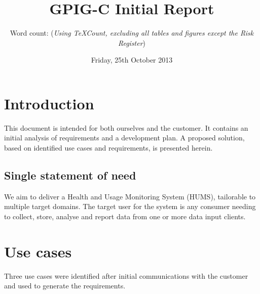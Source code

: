 \documentclass[10pt,a4paper]{article}
\begin{document}
\title{\vspace{-1cm}GPIG-C Initial Report}
\author{Word count:  (\textit{Using TeXCount, excluding all tables and figures except the Risk Register})}
\date{Friday, 25th October 2013}
\maketitle
\thispagestyle{fancy} %


\section{Introduction} %
This document is intended for both ourselves and the customer. It contains
an initial analysis of requirements and a development plan. A proposed solution,
based on identified use cases and requirements, is presented herein.
 
\subsection{Single statement of need} %
We aim to deliver a Health and Usage Monitoring System (HUMS), tailorable to
multiple target domains. The target user for the system is any consumer needing
to collect, store, analyse and report data from one or more data input clients.


\section{Use cases}
Three use cases were identified after initial communications with the customer and used to generate the requirements. 
\end{document}
